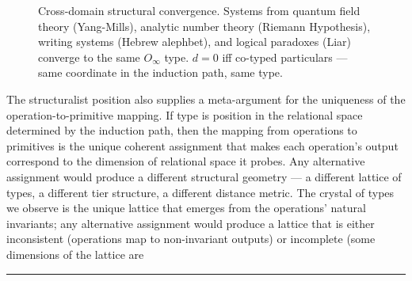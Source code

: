 \documentclass[12pt,a4paper]{article}
\begin{document}
\begin{figure}[htbp]
{
}

\caption{Cross-domain structural convergence. Systems from quantum field theory (Yang-Mills), analytic number theory (Riemann Hypothesis), writing systems (Hebrew alephbet), and logical paradoxes (Liar) converge to the same $O_{\infty}$ type. $d = 0$ iff co-typed particulars --- same coordinate in the induction path, same type.}
\label{fig:cross-domain-convergence}
\end{figure}

The structuralist position also supplies a meta-argument for the uniqueness of the
operation-to-primitive mapping. If
type is position in the relational space determined by the induction path, then the mapping from operations
to primitives is the unique coherent assignment that makes each operation's output correspond to the dimension of
relational space it probes. Any alternative assignment would produce a different structural geometry
--- a different
lattice of types, a different tier structure, a different distance metric. The crystal of types we observe is the
unique lattice that emerges from the operations' natural invariants; any alternative assignment would produce a lattice
that is either inconsistent (operations map to non-invariant outputs) or incomplete (some dimensions of the lattice are

\begin{center}
\rule{0.5\textwidth}{0.4pt}
\end{center}
\end{document}
